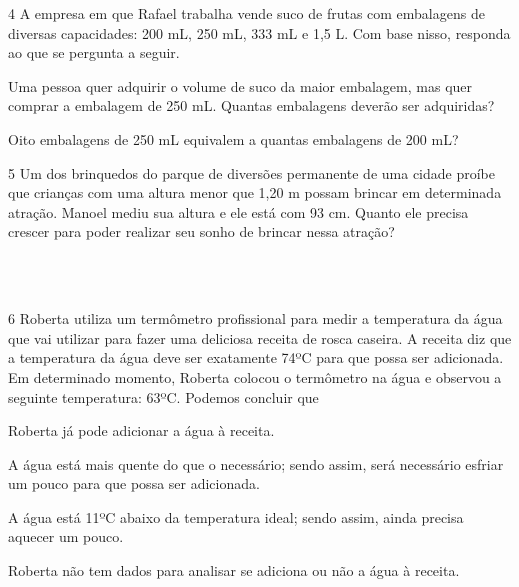 
\num{4} A empresa em que Rafael trabalha vende suco de frutas com embalagens de
diversas capacidades: 200 mL, 250 mL, 333 mL e 1,5 L. Com base nisso, responda ao que se pergunta a seguir.

\begin{escolha}
\item Uma pessoa quer adquirir o volume de suco da maior embalagem,
  mas quer comprar a embalagem de 250 mL. Quantas embalagens deverão ser adquiridas?


\item Oito embalagens de 250 mL equivalem a quantas embalagens de 200 mL?

\end{escolha}


\num{5} Um dos brinquedos do parque de diversões permanente de uma cidade proíbe
que crianças com uma altura menor que 1,20 m possam brincar em determinada
atração. Manoel mediu sua altura e ele está com 93 cm. Quanto ele
precisa crescer para poder realizar seu sonho de brincar nessa atração?

\begin{mdframed}[linewidth=2pt,linecolor=salmao,roundcorner=2pt]
\\
\\
\end{mdframed}

\num{6} Roberta utiliza um termômetro profissional para medir a temperatura da
água que vai utilizar para fazer uma deliciosa receita de rosca
caseira. A receita diz que a temperatura da água deve ser exatamente 74ºC
para que possa ser adicionada. Em determinado momento, Roberta colocou
o termômetro na água e observou a seguinte temperatura: 63ºC. Podemos concluir que

\begin{escolha}
\item
  Roberta já pode adicionar a água à receita.
\item
  A água está mais quente do que o necessário; sendo assim, será
  necessário esfriar um pouco para que possa ser adicionada.
\item
  A água está 11ºC abaixo da temperatura ideal; sendo assim, ainda
  precisa aquecer um pouco.
\item
  Roberta não tem dados para analisar se adiciona ou não a água à receita.
\end{escolha}

